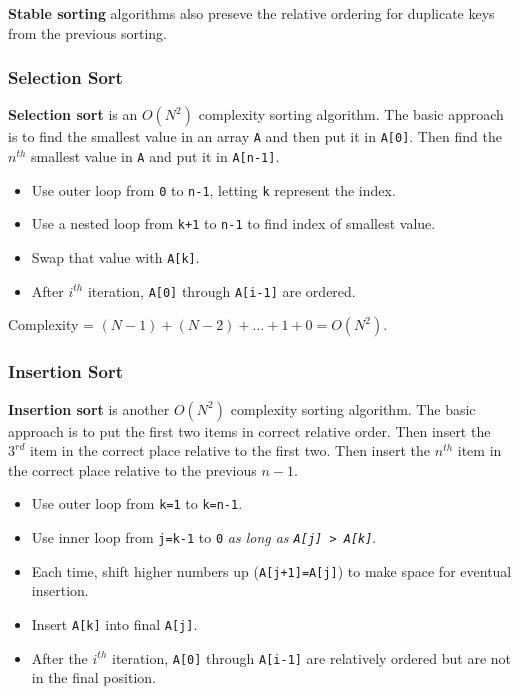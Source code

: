 \textbf{Stable sorting} algorithms also preseve the relative ordering for duplicate keys from the previous sorting. 

\subsubsection{Selection Sort}

\textbf{Selection sort} is an $O(N^{2})$ complexity sorting algorithm. The basic approach is to find the smallest value in an array \texttt{A} and then put it in \texttt{A[0]}. Then find the $n^{th}$ smallest value in \texttt{A} and put it in \texttt{A[n-1]}.

\begin{itemize}
	\item Use outer loop from \texttt{0} to \texttt{n-1}, letting \texttt{k} represent the index.
	\item Use a nested loop from \texttt{k+1} to \texttt{n-1} to find index of smallest value.
	\item Swap that value with \texttt{A[k]}. 
	\item After $i^{th}$ iteration, \texttt{A[0]} through \texttt{A[i-1]} are ordered.
\end{itemize}

Complexity = $(N-1) + (N-2) + ... + 1 + 0 = O(N^{2})$.

\subsubsection{Insertion Sort}

\textbf{Insertion sort} is another $O(N^{2})$ complexity sorting algorithm. The basic approach is to put the first two items in correct relative order. Then insert the $3^{rd}$ item in the correct place relative to the first two. Then insert the $n^{th}$ item in the correct place relative to the previous $n-1$. 

\begin{itemize}
	\item Use outer loop from \texttt{k=1} to \texttt{k=n-1}.
	\item Use inner loop from \texttt{j=k-1} to \texttt{0} \textit{as long as \texttt{A[j] > A[k]}}. 
	\item Each time, shift higher numbers up (\texttt{A[j+1]=A[j]}) to make space for eventual insertion. 
	\item Insert \texttt{A[k]} into final \texttt{A[j]}. 
	\item After the $i^{th}$ iteration, \texttt{A[0]} through \texttt{A[i-1]} are relatively ordered but are not in the final position. 
\end{itemize}

